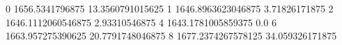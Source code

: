 0 1656.5341796875 13.3560791015625
1 1646.8963623046875 3.71826171875
2 1646.1112060546875 2.93310546875
4 1643.1781005859375 0.0
6 1663.957275390625 20.7791748046875
8 1677.2374267578125 34.059326171875
